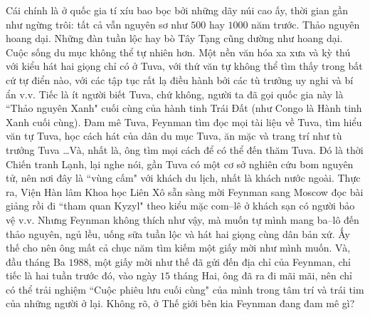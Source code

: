 \begin{multicols}{2}
\begin{figure}[H]
	\end{figure}
	Cái chính là ở quốc gia tí xíu bao bọc bởi những dãy núi cao ấy, thời gian gần như ngừng trôi: tất cả vẫn nguyên sơ như $500$ hay $1000$ năm trước. Thảo nguyên hoang dại. Những đàn tuần lộc hay bò Tây Tạng cũng dường như hoang dại. Cuộc sống du mục không thể tự nhiên hơn. Một nền văn hóa xa xưa và kỳ thú với kiểu hát hai giọng chỉ có ở Tuva, với thứ văn tự không thể tìm thấy trong bất cứ tự điển nào, với các tập tục rất lạ điều hành bởi các tù trưởng uy nghi và bí ẩn v.v. Tiếc là ít người biết Tuva, chứ không, người ta đã gọi quốc gia này là ``Thảo nguyên Xanh" cuối cùng của hành tinh Trái Đất (như Congo là Hành tinh Xanh cuối cùng). Đam mê Tuva, Feynman tìm đọc mọi tài liệu về Tuva, tìm hiểu văn tự Tuva, học cách hát của dân du mục Tuva, ăn mặc và trang trí như tù trưởng Tuva \ldots Và, nhất là, ông tìm mọi cách để có thể đến thăm Tuva.
	\vskip 0.1cm
	Đó là thời Chiến tranh Lạnh, lại nghe nói, gần Tuva có một cơ sở nghiên cứu bom nguyên tử, nên nơi đây là ``vùng cấm" với khách du lịch, nhất là khách nước ngoài. Thực ra, Viện Hàn lâm Khoa học Liên Xô sẵn sàng mời Feynman sang Moscow  đọc bài giảng rồi đi ``tham quan Kyzyl" theo kiểu mặc com--lê ở khách sạn có người bảo vệ v.v. Nhưng Feynman không thích như vậy, mà muốn tự mình mang ba--lô đến thảo nguyên, ngủ lều, uống sữa tuần lộc và hát hai giọng cùng dân bản xứ. Ấy thế cho nên ông mất cả chục năm tìm kiếm một giấy mời như mình muốn. Và, đầu tháng Ba $1988$, một giấy mời như thế đã gửi đến địa chỉ của Feynman, chỉ tiếc là hai tuần trước đó, vào ngày $15$ tháng Hai, ông đã ra đi mãi mãi, nên chỉ có thể trải nghiệm ``Cuộc phiêu lưu cuối cùng" của mình trong tâm trí và trái tim của những người ở lại. Không rõ, ở Thế giới bên kia Feynman đang đam mê gì?
\end{multicols}